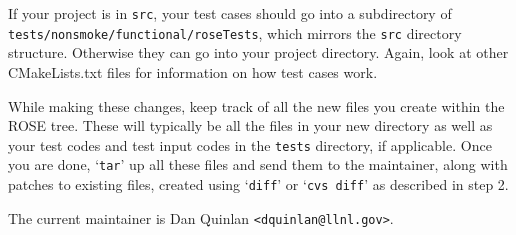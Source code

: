 \begin{enumerate}
If your project is in \verb|src|, your test cases should go into a subdirectory of \verb|tests/nonsmoke/functional/roseTests|, which mirrors the \verb|src| directory structure. Otherwise they can go into your project directory. Again, look at other CMakeLists.txt files for information on how test cases work.

While making these changes, keep track of all the new files you create within the ROSE tree.  These will typically be all the files in your new directory as well as your test codes and test input codes in the \verb|tests| directory, if applicable.  Once you are done, `\verb|tar|' up all these files and send them to the maintainer, along with patches to existing files, created using `\verb|diff|' or `\verb|cvs diff|' as described in step 2.
\end{enumerate}

The current maintainer is Dan Quinlan \verb|<dquinlan@llnl.gov>|.
